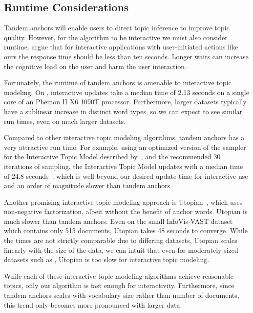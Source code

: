 \subsection{Runtime Considerations}


Tandem anchors will enable users to direct topic inference to improve topic
quality.
However, for the algorithm to be interactive we must also consider runtime.
 argue that for interactive applications
with user-initiated actions like ours the response time should be less than ten seconds.
Longer waits can increase the cognitive load on the user and harm
the user interaction.

Fortunately, the runtime of tandem anchors is amenable to interactive topic
modeling.
On \twentynews{}, interactive updates take a median time of 2.13
seconds on a single core of an  Phemon II X6
1090T processor.
Furthermore, larger datasets typically have a sublinear increase in distinct
word types, so we can expect to see similar run times, even on much larger
datasets.

Compared to other interactive topic modeling algorithms, tandem anchors has a
very attractive run time.
For example, using an optimized version of the sampler for the Interactive
Topic Model described by~, and the recommended 30 iterations
of sampling, the Interactive Topic Model updates with a median time of 24.8
seconds~\cite{itm-fast}, which
is well beyond our desired update time
for interactive use and an order of magnitude slower than tandem anchors.

Another promising interactive topic modeling approach is
Utopian~\cite{utopian}, which uses non-negative factorization, albeit without
the benefit of anchor words.
Utopian is much slower than tandem anchors.
Even on the small InfoVis-VAST dataset which contains only 515 documents,
Utopian takes 48 seconds to converge.
While the times are not strictly comparable due to differing datasets,
Utopian scales linearly with the size of the data, we can intuit that even for
moderately sized datasets such as \twentynews{}, Utopian is too slow for
interactive topic modeling.

While each of these interactive topic modeling algorithms achieve reasonable
topics, only our algorithm is fast enough for interactivity.
Furthermore, since tandem anchors scales with vocabulary size rather
than number of documents, this trend only becomes more pronounced
with larger data.
